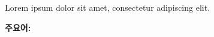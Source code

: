 \thispagestyle{plain}
\begin{abstract*}
  Lorem ipsum dolor sit amet, consectetur adipiscing elit.
\end{abstract*}
\textbf{주요어: }
\vfill
